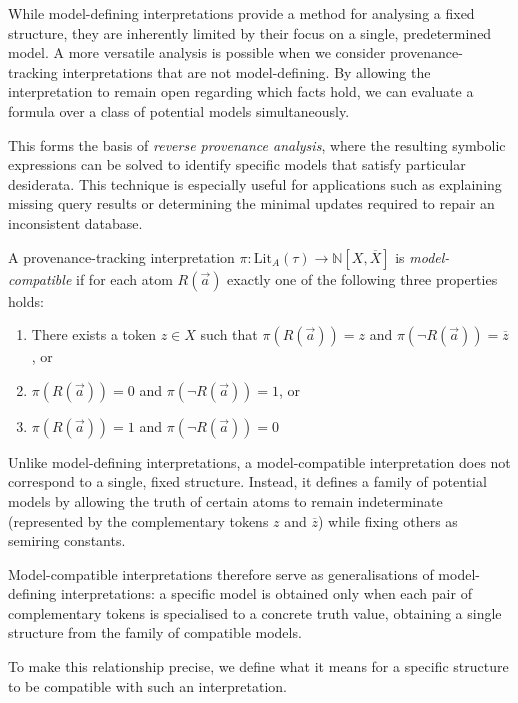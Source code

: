 \documentclass[oneside, 11pt]{amsbook}
\theoremstyle{plain}
\theoremstyle{definition}
\theoremstyle{remark}
\begin{document}
While model-defining interpretations provide a method for analysing a fixed structure, they are inherently limited by their focus on a single, predetermined model. A more versatile analysis is possible when we consider provenance-tracking interpretations that are not model-defining. By allowing the interpretation to remain open regarding which facts hold, we can evaluate a formula over a class of potential models simultaneously.

This forms the basis of \emph{reverse provenance analysis}, where the resulting symbolic expressions can be solved to identify specific models that satisfy particular desiderata. This technique is especially useful for applications such as explaining missing query results or determining the minimal updates required to repair an inconsistent database.

\begin{defn}
    A provenance-tracking interpretation $\pi: \mathrm{Lit}_A (\tau) \rightarrow \mathbb{N}[X,\overline{X}]$ is \emph{model-compatible} if for each atom $R(\vec{a})$ exactly one of the following three properties holds:
    \begin{enumerate}
        \item There exists a token $z\in X$ such that $\pi(R(\vec a)) = z$ and $\pi(\lnot R (\vec a)) = \overline{z}$, or
        \item $\pi(R (\vec a))=0$ and $\pi(\lnot R (\vec a))=1$, or
        \item $\pi(R (\vec a))=1$ and $\pi(\lnot R (\vec a))=0$
    \end{enumerate}
\end{defn}

Unlike model-defining interpretations, a model-compatible interpretation does not correspond to a single, fixed structure. Instead, it defines a family of potential models by allowing the truth of certain atoms to remain indeterminate (represented by the complementary tokens $z$ and $\overline{z}$) while fixing others as semiring constants.

Model-compatible interpretations therefore serve as generalisations of model-defining interpretations: a specific model is obtained only when each pair of complementary tokens is specialised to a concrete truth value, obtaining a single structure from the family of compatible models.

To make this relationship precise, we define what it means for a specific structure to be compatible with such an interpretation.
\end{document}
